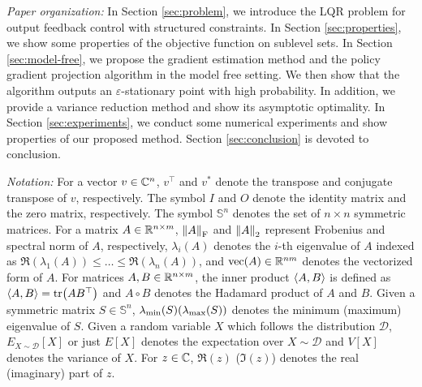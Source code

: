 {\it Paper organization:}
In Section \ref{sec:problem}, we introduce the LQR problem for output feedback control with structured constraints.
In Section \ref{sec:properties}, we show some properties of the objective function on sublevel sets.
In Section \ref{sec:model-free}, we propose the gradient estimation method and the policy gradient projection algorithm in the model free setting.
We then show that the algorithm outputs an $\varepsilon$-stationary point with high probability.
In addition, we provide a variance reduction method and show its asymptotic optimality.
In Section \ref{sec:experiments}, we conduct some numerical experiments and show properties of our proposed method.
Section \ref{sec:conclusion} is devoted to conclusion.

{\it Notation:}
For a vector $v \in \mathbb{C}^n$, $v^\top$ and $v^*$ denote the transpose and conjugate transpose of $v$, respectively.
The symbol $I$ and $O$ denote the identity matrix and the zero matrix, respectively.
The symbol $\mathbb{S}^n$ denotes the set of $n\times n$ symmetric matrices.
For a matrix $A\in \mathbb{R}^{n\times m}$, $\norm{A}_\mathrm{F}$ and $\norm{A}_2$ represent Frobenius and spectral norm of $A$, respectively,
$\lambda_i(A)$ denotes the $i$-th eigenvalue of $A$ indexed as $\Re(\lambda_1(A)) \leq \dots \leq \Re(\lambda_n(A))$,
and $\operatorname{vec}(A) \in \mathbb{R}^{nm}$ denotes the vectorized form of $A$.
For matrices $A, B \in \mathbb{R}^{n\times m}$, the inner product $\q<A, B>$ is defined as $\q<A, B> = \tr(AB^\top)$
and $A\circ B$ denotes the Hadamard product of $A$ and $B$.
Given a symmetric matrix $S \in \mathbb{S}^n$, $\lambda_{\min}(S)(\lambda_{\max}(S))$ denotes the minimum (maximum) eigenvalue of $S$.
Given a random variable $X$ which follows the distribution $\mathcal D$,
$E_{X \sim \mathcal{D}}[X]$ or just $E[X]$ denotes the expectation over $X \sim \mathcal D$
and $V[X]$ denotes the variance of $X$. For $z\in \mathbb{C}$, $\Re(z)$ ($\Im(z)$) denotes the real (imaginary) part of $z$.
% 